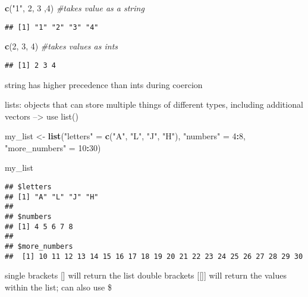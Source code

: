 \documentclass[
]{article}
\newenvironment{Shaded}{\begin{snugshade}}{\end{snugshade}}
\newcommand{\CommentTok}[1]{\textcolor[rgb]{0.56,0.35,0.01}{\textit{#1}}}
\newcommand{\DecValTok}[1]{\textcolor[rgb]{0.00,0.00,0.81}{#1}}
\newcommand{\FunctionTok}[1]{\textcolor[rgb]{0.13,0.29,0.53}{\textbf{#1}}}
\newcommand{\NormalTok}[1]{#1}
\newcommand{\OtherTok}[1]{\textcolor[rgb]{0.56,0.35,0.01}{#1}}
\newcommand{\SpecialCharTok}[1]{\textcolor[rgb]{0.81,0.36,0.00}{\textbf{#1}}}
\newcommand{\StringTok}[1]{\textcolor[rgb]{0.31,0.60,0.02}{#1}}
\begin{document}
\begin{Shaded}
\begin{Highlighting}[]
\FunctionTok{c}\NormalTok{(}\StringTok{"1"}\NormalTok{, }\DecValTok{2}\NormalTok{, }\DecValTok{3}\NormalTok{ ,}\DecValTok{4}\NormalTok{) }\CommentTok{\#takes value as a string}
\end{Highlighting}
\end{Shaded}

\begin{verbatim}
## [1] "1" "2" "3" "4"
\end{verbatim}

\begin{Shaded}
\begin{Highlighting}[]
\FunctionTok{c}\NormalTok{(}\DecValTok{2}\NormalTok{, }\DecValTok{3}\NormalTok{, }\DecValTok{4}\NormalTok{) }\CommentTok{\#takes values as ints}
\end{Highlighting}
\end{Shaded}

\begin{verbatim}
## [1] 2 3 4
\end{verbatim}

string has higher precedence than ints during coercion

lists: objects that can store multiple things of different types,
including additional vectors --\textgreater{} use list()

\begin{Shaded}
\begin{Highlighting}[]
\NormalTok{my\_list }\OtherTok{\textless{}{-}} \FunctionTok{list}\NormalTok{(}\StringTok{"letters"} \OtherTok{=} \FunctionTok{c}\NormalTok{(}\StringTok{"A"}\NormalTok{, }\StringTok{"L"}\NormalTok{, }\StringTok{"J"}\NormalTok{, }\StringTok{"H"}\NormalTok{),}
                \StringTok{"numbers"} \OtherTok{=} \DecValTok{4}\SpecialCharTok{:}\DecValTok{8}\NormalTok{,}
                \StringTok{"more\_numbers"} \OtherTok{=} \DecValTok{10}\SpecialCharTok{:}\DecValTok{30}\NormalTok{) }

\NormalTok{my\_list}
\end{Highlighting}
\end{Shaded}

\begin{verbatim}
## $letters
## [1] "A" "L" "J" "H"
## 
## $numbers
## [1] 4 5 6 7 8
## 
## $more_numbers
##  [1] 10 11 12 13 14 15 16 17 18 19 20 21 22 23 24 25 26 27 28 29 30
\end{verbatim}

single brackets {[}{]} will return the list double brackets {[}{[}{]}{]}
will return the values within the list; can also use \$
\end{document}
